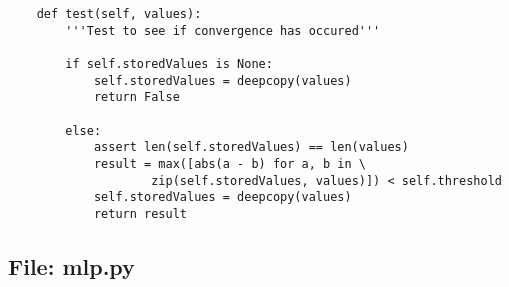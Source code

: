 \documentclass{article}
\begin{document}
\begin{verbatim}
    def test(self, values):
        '''Test to see if convergence has occured'''

        if self.storedValues is None:
            self.storedValues = deepcopy(values)
            return False

        else:
            assert len(self.storedValues) == len(values)
            result = max([abs(a - b) for a, b in \
                    zip(self.storedValues, values)]) < self.threshold
            self.storedValues = deepcopy(values)
            return result

\end{verbatim}

\subsection*{File: mlp.py}
\end{document}
